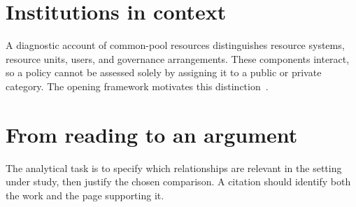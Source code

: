 \documentclass[11pt]{article}
\begin{document}
\section{Institutions in context}
A diagnostic account of common-pool resources distinguishes
resource systems, resource units, users, and governance arrangements.
These components interact, so a policy cannot be assessed solely
by assigning it to a public or private category.
The opening framework motivates this distinction~\citep{ostrom2009}.
\section{From reading to an argument}
The analytical task is to specify which relationships are relevant
in the setting under study, then justify the chosen comparison.
A citation should identify both the work and the page supporting it.


\end{document}
